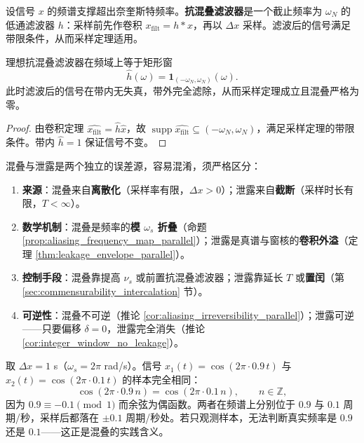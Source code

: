 \begin{definition}[抗混叠滤波器]\label{def:anti_aliasing_filter}
设信号 $x$ 的频谱支撑超出奈奎斯特频率。\textbf{抗混叠滤波器}是一个截止频率为 $\omega_N$ 的低通滤波器 $h$：采样前先作卷积 $x_{\text{filt}}=h*x$，再以 $\Delta x$ 采样。滤波后的信号满足带限条件，从而采样定理适用。
\end{definition}

\begin{property}[抗混叠滤波器的理想特性]\label{prop:anti_aliasing_ideal}
理想抗混叠滤波器在频域上等于矩形窗
\[
\hat h(\omega)=\mathbf{1}_{(-\omega_N,\omega_N)}(\omega).
\]
此时滤波后的信号在带内无失真，带外完全滤除，从而采样定理成立且混叠严格为零。
\end{property}

\begin{proof}
由卷积定理 $\widehat{x_{\text{filt}}}=\hat h\hat x$，故 $\operatorname{supp}\widehat{x_{\text{filt}}}\subseteq(-\omega_N,\omega_N)$，满足采样定理的带限条件。带内 $\hat h=1$ 保证信号不变。
\end{proof}

\begin{remark}[混叠与泄露的区别]\label{rem:aliasing_vs_leakage}
混叠与泄露是两个独立的误差源，容易混淆，须严格区分：
\begin{enumerate}[label=(\roman*)]
    \item \textbf{来源}：混叠来自\textbf{离散化}（采样率有限，$\Delta x>0$）；泄露来自\textbf{截断}（采样时长有限，$T<\infty$）。
    \item \textbf{数学机制}：混叠是频率的\textbf{模 $\omega_s$ 折叠}（命题 \ref{prop:aliasing_frequency_map_parallel}）；泄露是真谱与窗核的\textbf{卷积外溢}（定理 \ref{thm:leakage_envelope_parallel}）。
    \item \textbf{控制手段}：混叠靠提高 $\nu_s$ 或前置抗混叠滤波器；泄露靠延长 $T$ 或\textbf{置闰}（第 \ref{sec:commensurability_intercalation} 节）。
    \item \textbf{可逆性}：混叠不可逆（推论 \ref{cor:aliasing_irreversibility_parallel}）；泄露可逆——只要偏移 $\delta=0$，泄露完全消失（推论 \ref{cor:integer_window_no_leakage}）。
\end{enumerate}
\end{remark}

\begin{example}[混叠的数值例子]\label{ex:aliasing_numeric}
取 $\Delta x=1$ s（$\omega_s=2\pi$ rad/s）。信号 $x_1(t)=\cos(2\pi\cdot0.9\,t)$ 与 $x_2(t)=\cos(2\pi\cdot0.1\,t)$ 的样本完全相同：
\[
\cos(2\pi\cdot0.9\,n)=\cos(2\pi\cdot0.1\,n),\qquad n\in\mathbb{Z},
\]
因为 $0.9\equiv-0.1\pmod1$ 而余弦为偶函数。两者在频谱上分别位于 $0.9$ 与 $0.1$ 周期/秒，采样后都落在 $\pm0.1$ 周期/秒处。若只观测样本，无法判断真实频率是 $0.9$ 还是 $0.1$——这正是混叠的实践含义。
\end{example}

